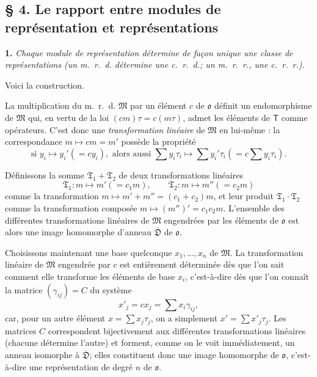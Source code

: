 \subsection*{\S{} 4. Le rapport entre modules de représentation et représentations}\label{fr-r823-rapport-modules-representations}

\textbf{1.} \emph{Chaque module de représentation détermine de façon unique une classe de représentations (un m.\ r.\ d. détermine une c.\ r.\ d.; un m.\ r.\ r., une c.\ r.\ r.).}

Voici la construction.

La multiplication du m.\ r.\ d. $\mathfrak M$ par un élément $c$ de $\mathfrak{o}$ définit un endomorphisme de $\mathfrak M$ qui, en vertu de la loi $(cm)\tau=c(m\tau)$, admet les éléments de $\mathsf T$ comme opérateurs. C'est donc une \emph{transformation linéaire} de $\mathfrak M$ en lui-même : la correspondance $m\mapsto cm=m'$ possède la propriété
\[
\text{si }y_i\mapsto y_i'(=cy_i),\text{ alors aussi }
\sum y_i\tau_i\mapsto\sum y_i'\tau_i\left(=c\sum y_i\tau_i\right).
\]

Définissons la somme $\mathfrak T_1+\mathfrak T_2$ de deux transformations linéaires
\[
\mathfrak T_1:m\mapsto m'(=c_1m),\qquad
\mathfrak T_2:m\mapsto m''(=c_2m)
\]
comme la transformation $m\mapsto m'+m''=(c_1+c_2)m$, et leur produit $\mathfrak T_1\cdot\mathfrak T_2$ comme la transformation composée $m\mapsto(m'')'=c_1c_2m$. L'ensemble des différentes transformations linéaires de $\mathfrak M$ engendrées par les éléments de $\mathfrak{o}$ est alors une image homomorphe d'anneau $\overline{\mathfrak D}$ de $\mathfrak{o}$.

Choisissons maintenant une base quelconque $x_1,\ldots,x_n$ de $\mathfrak M$. La transformation linéaire de $\mathfrak M$ engendrée par $c$ est entièrement déterminée dès que l'on sait comment elle transforme les éléments de base $x_i$, c'est-à-dire dès que l'on connaît la matrice $(\gamma_{ij})=C$ du système
\[
x'_j=cx_j=\sum x_i\gamma_{ij},
\]
car, pour un autre élément $x=\sum x_j\tau_j$, on a simplement $x'=\sum x'_j\tau_j$. Les matrices $C$ correspondent bijectivement aux différentes transformations linéaires (chacune détermine l'autre) et forment, comme on le voit immédiatement, un anneau isomorphe à $\overline{\mathfrak D}$; elles constituent donc une image homomorphe de $\mathfrak{o}$, c'est-à-dire une représentation de degré $n$ de $\mathfrak{o}$.

